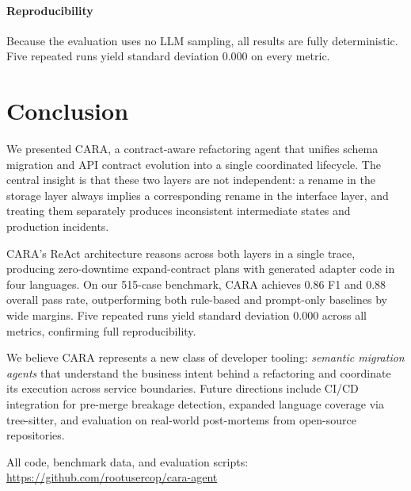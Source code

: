 \documentclass[10pt,twocolumn]{article}
\begin{document}
\paragraph{Reproducibility} Because the evaluation uses no LLM sampling, all
results are fully deterministic. Five repeated runs yield standard deviation
0.000 on every metric.

\section{Conclusion}

We presented CARA, a contract-aware refactoring agent that unifies schema
migration and API contract evolution into a single coordinated lifecycle.
The central insight is that these two layers are not independent: a rename
in the storage layer always implies a corresponding rename in the interface
layer, and treating them separately produces inconsistent intermediate states
and production incidents.

CARA's ReAct architecture reasons across both layers in a single trace,
producing zero-downtime expand-contract plans with generated adapter code
in four languages. On our 515-case benchmark, CARA achieves 0.86 F1 and
0.88 overall pass rate, outperforming both rule-based and prompt-only baselines
by wide margins. Five repeated runs yield standard deviation 0.000 across all
metrics, confirming full reproducibility.

We believe CARA represents a new class of developer tooling: \emph{semantic
migration agents} that understand the business intent behind a refactoring
and coordinate its execution across service boundaries. Future directions
include CI/CD integration for pre-merge breakage detection, expanded language
coverage via tree-sitter, and evaluation on real-world post-mortems from
open-source repositories.

\smallskip
\noindent All code, benchmark data, and evaluation scripts:
\url{https://github.com/rootusercop/cara-agent}

\balance


\end{document}
